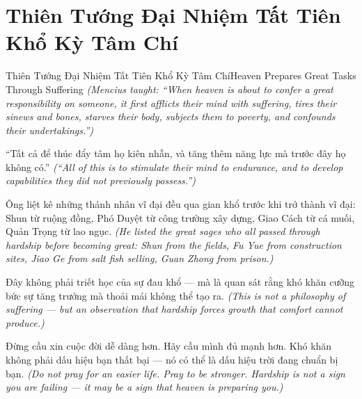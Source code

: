 \section{Thiên Tướng Đại Nhiệm Tất Tiên Khổ Kỳ Tâm Chí}
\begin{truyen}{Thiên Tướng Đại Nhiệm Tất Tiên Khổ Kỳ Tâm Chí}{Heaven Prepares Great Tasks Through Suffering}
\textit{(Mencius taught: ``When heaven is about to confer a great responsibility on someone, it first afflicts their mind with suffering, tires their sinews and bones, starves their body, subjects them to poverty, and confounds their undertakings.'')}

``Tất cả để thúc đẩy tâm họ kiên nhẫn, và tăng thêm năng lực mà trước đây họ không có.''
\textit{(``All of this is to stimulate their mind to endurance, and to develop capabilities they did not previously possess.'')}

Ông liệt kê những thánh nhân vĩ đại đều qua gian khổ trước khi trở thành vĩ đại: Shun từ ruộng đồng, Phó Duyệt từ công trường xây dựng, Giao Cách từ cá muối, Quản Trọng từ lao ngục.
\textit{(He listed the great sages who all passed through hardship before becoming great: Shun from the fields, Fu Yue from construction sites, Jiao Ge from salt fish selling, Guan Zhong from prison.)}

Đây không phải triết học của sự đau khổ — mà là quan sát rằng khó khăn cưỡng bức sự tăng trưởng mà thoải mái không thể tạo ra.
\textit{(This is not a philosophy of suffering — but an observation that hardship forces growth that comfort cannot produce.)}

\end{truyen}

\begin{baihoc}
Đừng cầu xin cuộc đời dễ dàng hơn. Hãy cầu mình đủ mạnh hơn. Khó khăn không phải dấu hiệu bạn thất bại — nó có thể là dấu hiệu trời đang chuẩn bị bạn.
\textit{(Do not pray for an easier life. Pray to be stronger. Hardship is not a sign you are failing — it may be a sign that heaven is preparing you.)}
\end{baihoc}
\ngancach

